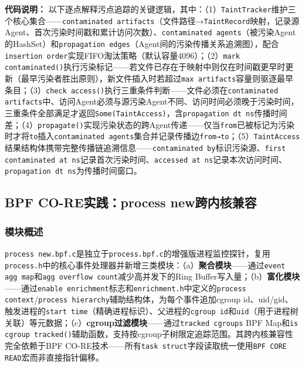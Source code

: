 \documentclass[a4paper]{ctexart}
\makeatletter
\renewcommand{\_}{%
  \ifmmode
    \nfss@text{\textunderscore}%
  \else
    \textunderscore\discretionary{}{}{}%
  \fi}
\makeatother
\begin{document}
\textbf{代码说明：} 以下逐点解释污点追踪的关键逻辑，其中：（1）\texttt{TaintTracker}维护三个核心集合——\texttt{contaminated\_artifacts}（文件路径→\texttt{TaintRecord}映射，记录源Agent、首次污染时间戳和累计访问次数）、\texttt{contaminated\_agents}（被污染Agent的HashSet）和\texttt{propagation\_edges}（Agent间的污染传播关系追溯图），配合\texttt{insertion\_order}实现FIFO淘汰策略（默认容量4096）；（2）\texttt{mark\_contaminated()}执行污染标记——若文件已存在于映射中则仅在时间戳更早时更新（最早污染者胜出原则），新文件插入时若超过\texttt{max\_artifacts}容量则驱逐最早条目；（3）\texttt{check\_access()}执行三重条件判断——文件必须在\texttt{contaminated\_artifacts}中、访问Agent必须与源污染Agent不同、访问时间必须晚于污染时间，三重条件全部满足才返回\texttt{Some(TaintAccess)}，含\texttt{propagation\_dt\_ns}传播时间差；（4）\texttt{propagate()}实现污染状态的跨Agent传递——仅当\texttt{from}已被标记为污染时才将\texttt{to}插入\texttt{contaminated\_agents}集合并记录传播边\texttt{from→to}；（5）\texttt{TaintAccess}结果结构体携带完整传播链追溯信息——\texttt{contaminated\_by}标识污染源、\texttt{first\_contaminated\_at\_ns}记录首次污染时间、\texttt{accessed\_at\_ns}记录本次访问时间、\texttt{propagation\_dt\_ns}为传播时间窗口。


\subsection{BPF CO-RE实践：process\_new跨内核兼容}



\subsubsection{模块概述}



\texttt{process\_new.bpf.c}是独立于\texttt{process.bpf.c}的增强版进程监控探针，复用\texttt{process.h}中的核心事件处理器并新增三类模块：（a）\textbf{聚合模块}——通过\texttt{event\_agg\_map}和\texttt{agg\_overflow\_count}减少高并发下的Ring Buffer写入量；（b）\textbf{富化模块}——通过\texttt{enable\_enrichment}标志和\texttt{enrichment.h}中定义的\texttt{process\_context}/\texttt{process\_hierarchy}辅助结构体，为每个事件追加cgroup\_id、uid/gid、触发进程的\texttt{start\_time}（精确进程标识）、父进程的\texttt{cgroup\_id}和\texttt{uid}（用于进程树关联）等元数据；（c）\textbf{cgroup过滤模块}——通过\texttt{tracked\_cgroups} BPF Map和\texttt{is\_cgroup\_tracked()}辅助函数，支持按cgroup子树限定追踪范围。其跨内核兼容性完全依赖于BPF CO-RE技术——所有\texttt{task\_struct}字段读取统一使用\texttt{BPF\_CORE\_READ}宏而非直接指针偏移。
\end{document}
